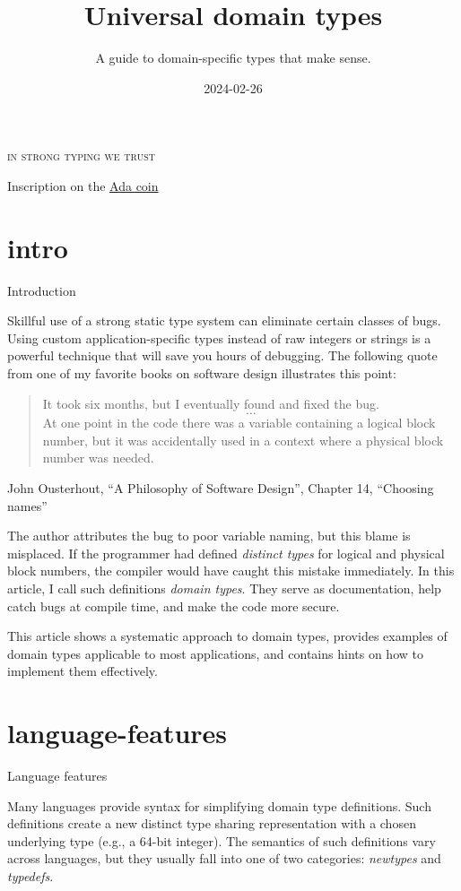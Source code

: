 \documentclass{article}
\title{Universal domain types}
\subtitle{A guide to domain-specific types that make sense.}
\date{2024-02-26}
\begin{document}
\epigraph{
  \textsc{in strong typing we trust}
}{Inscription on the \href{https://people.cs.kuleuven.be/~dirk.craeynest/ada-belgium/pictures/ada-strong.html}{Ada coin}}

\section{intro}{Introduction}

Skillful use of a strong static type system can eliminate certain classes of bugs.
Using custom application-specific types instead of raw integers or strings is a powerful technique that will save you hours of debugging.
The following quote from one of my favorite books on software design illustrates this point:

\blockquote{
  It took six months, but I eventually found and fixed the bug. \[\ldots\]
  At one point in the code there was a  variable containing a logical block number, but it was accidentally used in a context where a physical block number was needed.
}{John Ousterhout, ``A Philosophy of Software Design'', Chapter 14, ``Choosing names''}

The author attributes the bug to poor variable naming, but this blame is misplaced.
If the programmer had defined \emph{distinct types} for logical and physical block numbers, the compiler would have caught this mistake immediately.
In this article, I call such definitions \emph{domain types}.
They serve as documentation, help catch bugs at compile time, and make the code more secure.

This article shows a systematic approach to domain types, provides examples of domain types applicable to most applications, and contains hints on how to implement them effectively.

\section{language-features}{Language features}

Many languages provide syntax for simplifying domain type definitions.
Such definitions create a new distinct type sharing representation with a chosen underlying type (e.g., a 64-bit integer).
The semantics of such definitions vary across languages, but they usually fall into one of two categories: \emph{newtypes} and \emph{typedefs}.
\end{document}
